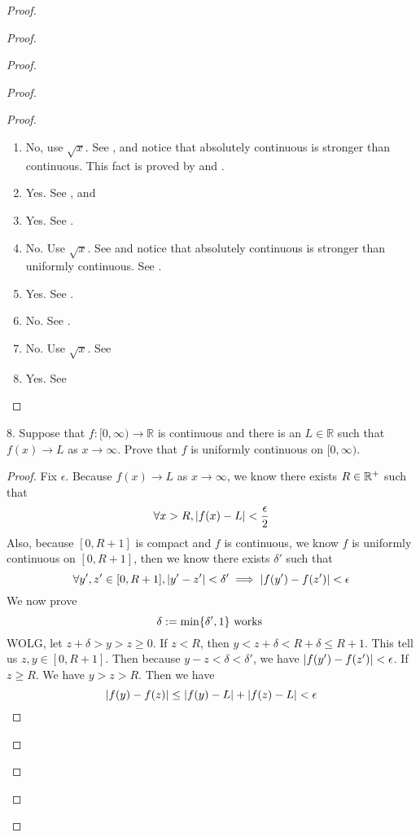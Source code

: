 \documentclass{report}
\begin{document}
\begin{proof}
\begin{proof}
\begin{proof}
\begin{proof}
\begin{proof}
\begin{enumerate}[label=(\roman*)]
  \item No, use $\sqrt{x} $. See , and notice that absolutely continuous is stronger than continuous. This fact is proved by  and . 
  \item Yes. See , and 
  \item Yes. See .
  \item No. Use $\sqrt{x}$. See  and notice that absolutely continuous is stronger than uniformly continuous. See .
  \item Yes. See .
  \item No. See .
  \item No. Use $\sqrt{x} $. See 
  \item Yes. See 
\end{enumerate}
\end{proof}
\begin{question}{}{}
8. Suppose that \( f : [0, \infty) \rightarrow \mathbb{R} \) is continuous and there is an \( L \in \mathbb{R} \) such that \( f(x) \rightarrow L \) as \( x \rightarrow \infty \). Prove that \( f \) is uniformly continuous on \( [0, \infty) \).
\end{question}
\begin{proof}
Fix $\epsilon $. 
Because $f(x)\to L$ as $x\to \infty$, we know there exists $R\in\mathbb{R}^+$ such that 
\begin{equation*}
\forall x>R, |f(x)-L|<\frac{\epsilon}{2}
\end{equation*}
Also, because $[0,R+1]$ is compact and $f$ is continuous, we know $f$ is uniformly continuous on  $[0,R+1]$, then we know there exists $\delta'$ such that 
\begin{equation*}
\forall y',z'\in [0,R+1], |y'-z'|<\delta'\implies |f(y')-f(z')|<\epsilon 
\end{equation*}
We now prove 
\begin{equation*}
\delta:=\min \{ \delta',1 \}\text{ works }
\end{equation*}
WOLG, let $z+\delta>y>z\geq 0$. If $z<R$, then  $y<z+\delta<R+\delta\leq R+1$. This tell us $z,y\in [0,R+1]$. Then because $y-z<\delta<\delta'$, we have $|f(y')-f(z')|<\epsilon $. If $z\geq R$. We have $y>z>R$. Then we have 
 \begin{equation*}
|f(y)-f(z)|\leq |f(y)-L|+|f(z)-L|<\epsilon 
\end{equation*}
\end{proof}
\begin{question}{}{}


\end{question}
\end{proof}
\end{proof}
\end{proof}
\end{proof}
\end{document}
